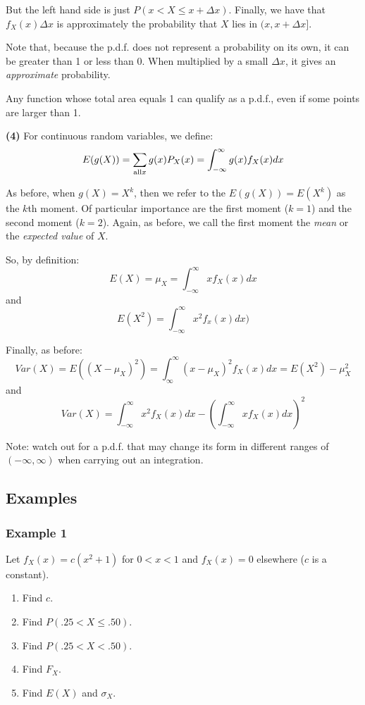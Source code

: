 \documentclass[12pt]{article}
\begin{document}
But the left hand side is just $P(x < X \leq x + \Delta x)$. Finally, we have that $f_X (x) \Delta x$ is approximately the probability that $X$ lies in $(x, x + \Delta x]$. %

Note that, because the p.d.f. does not represent a probability on its own, it can be greater than 1 or less than 0. When multiplied by a small $\Delta x$, it gives an \emph{approximate} probability.

Any function whose total area equals 1 can qualify as a p.d.f., even if some points are larger than 1.

\textbf{(4)} For continuous random variables, we define:
\[
    E(g(X)) = \sum_{\textnormal{all} x} g(x) P_X (x) = \int_{-\infty}^{\infty} g(x) f_X (x) dx
\]

As before, when $g(X) = X^k$, then we refer to the $E(g(X)) = E(X^k)$ as the $k$th moment. Of particular importance are the first moment ($k=1$) and the second moment ($k=2$). Again, as before, we call the first moment the \emph{mean} or the \emph{expected value} of $X$.

So, by definition:
\[
    E(X) = \mu_X = \int_{-\infty}^{\infty} x f_X (x) dx
\]
and
\[
    E(X^2) = \int_{-\infty}^{\infty} x^2 f_x (x) dx)
\]

Finally, as before:
\[
    Var(X) = E((X - \mu_X)^2) = \int_{\infty}^{\infty} (x - \mu_X)^2 f_X (x) dx = E(X^2) - \mu_X^2
\]
and
\[
    Var(X) = \int_{-\infty}^{\infty} x^2 f_X (x) dx - (\int_{-\infty}^{\infty} x f_X (x) dx)^2
\]

Note: watch out for a p.d.f. that may change its form in different ranges of $(-\infty,\infty)$ when carrying out an integration.

\subsection{Examples}
\subsubsection{Example 1}
Let $f_X (x) = c(x^2 + 1)$ for $0 < x < 1$ and $f_X (x) = 0$ elsewhere ($c$ is a constant).
\begin{enumerate}
    \item Find $c$.
    \item Find $P(.25 < X \leq .50)$.
    \item Find $P(.25 < X < .50)$.
    \item Find $F_X$.
    \item Find $E(X)$ and $\sigma_X$.
\end{enumerate}
\end{document}
